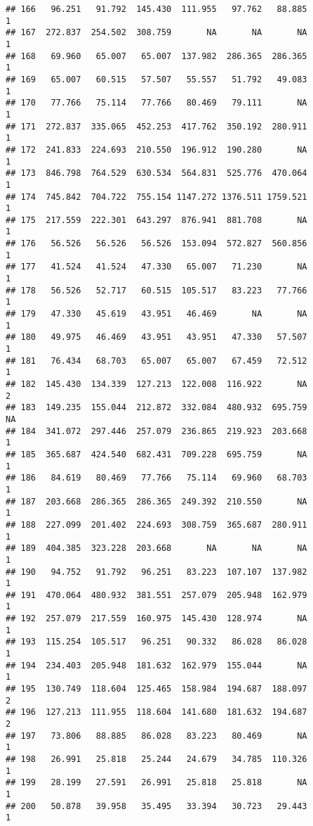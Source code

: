 \documentclass[
]{article}
\begin{document}
\begin{verbatim}
## 166   96.251   91.792  145.430  111.955   97.762   88.885             1
## 167  272.837  254.502  308.759       NA       NA       NA             1
## 168   69.960   65.007   65.007  137.982  286.365  286.365             1
## 169   65.007   60.515   57.507   55.557   51.792   49.083             1
## 170   77.766   75.114   77.766   80.469   79.111       NA             1
## 171  272.837  335.065  452.253  417.762  350.192  280.911             1
## 172  241.833  224.693  210.550  196.912  190.280       NA             1
## 173  846.798  764.529  630.534  564.831  525.776  470.064             1
## 174  745.842  704.722  755.154 1147.272 1376.511 1759.521             1
## 175  217.559  222.301  643.297  876.941  881.708       NA             1
## 176   56.526   56.526   56.526  153.094  572.827  560.856             1
## 177   41.524   41.524   47.330   65.007   71.230       NA             1
## 178   56.526   52.717   60.515  105.517   83.223   77.766             1
## 179   47.330   45.619   43.951   46.469       NA       NA             1
## 180   49.975   46.469   43.951   43.951   47.330   57.507             1
## 181   76.434   68.703   65.007   65.007   67.459   72.512             1
## 182  145.430  134.339  127.213  122.008  116.922       NA             2
## 183  149.235  155.044  212.872  332.084  480.932  695.759            NA
## 184  341.072  297.446  257.079  236.865  219.923  203.668             1
## 185  365.687  424.540  682.431  709.228  695.759       NA             1
## 186   84.619   80.469   77.766   75.114   69.960   68.703             1
## 187  203.668  286.365  286.365  249.392  210.550       NA             1
## 188  227.099  201.402  224.693  308.759  365.687  280.911             1
## 189  404.385  323.228  203.668       NA       NA       NA             1
## 190   94.752   91.792   96.251   83.223  107.107  137.982             1
## 191  470.064  480.932  381.551  257.079  205.948  162.979             1
## 192  257.079  217.559  160.975  145.430  128.974       NA             1
## 193  115.254  105.517   96.251   90.332   86.028   86.028             1
## 194  234.403  205.948  181.632  162.979  155.044       NA             1
## 195  130.749  118.604  125.465  158.984  194.687  188.097             2
## 196  127.213  111.955  118.604  141.680  181.632  194.687             2
## 197   73.806   88.885   86.028   83.223   80.469       NA             1
## 198   26.991   25.818   25.244   24.679   34.785  110.326             1
## 199   28.199   27.591   26.991   25.818   25.818       NA             1
## 200   50.878   39.958   35.495   33.394   30.723   29.443             1

\end{verbatim}
\end{document}
